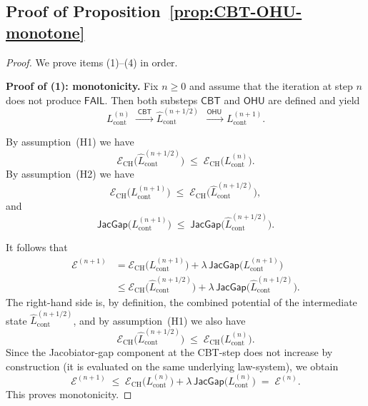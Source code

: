 \documentclass[11pt]{book}
\theoremstyle{plain}
\theoremstyle{definition}
\begin{document}
\subsection*{Proof of Proposition~\ref{prop:CBT-OHU-monotone}}


\begin{proof}
We prove items \textnormal{(1)}–\textnormal{(4)} in order.

\medskip\noindent
\textbf{Proof of (1): monotonicity.}
Fix \(n\ge 0\) and assume that the iteration at step \(n\) does not
produce \(\mathsf{FAIL}\).  Then both substeps \(\mathsf{CBT}\) and
\(\mathsf{OHU}\) are defined and yield
\[
  L_{\mathrm{cont}}^{(n)}
  \;\xrightarrow{\;\mathsf{CBT}\;}
  \widehat{L}_{\mathrm{cont}}^{(n+1/2)}
  \;\xrightarrow{\;\mathsf{OHU}\;}
  L_{\mathrm{cont}}^{(n+1)}.
\]

By assumption~(H1) we have
\[
  \mathcal{E}_{\mathrm{CH}}\bigl(
    \widehat{L}_{\mathrm{cont}}^{(n+1/2)}
  \bigr)
  \;\le\;
  \mathcal{E}_{\mathrm{CH}}\bigl(
    L_{\mathrm{cont}}^{(n)}
  \bigr).
\]
By assumption~(H2) we have
\[
  \mathcal{E}_{\mathrm{CH}}\bigl(
    L_{\mathrm{cont}}^{(n+1)}
  \bigr)
  \;\le\;
  \mathcal{E}_{\mathrm{CH}}\bigl(
    \widehat{L}_{\mathrm{cont}}^{(n+1/2)}
  \bigr),
\]
and
\[
  \mathsf{JacGap}\bigl(
    L_{\mathrm{cont}}^{(n+1)}
  \bigr)
  \;\le\;
  \mathsf{JacGap}\bigl(
    \widehat{L}_{\mathrm{cont}}^{(n+1/2)}
  \bigr).
\]

It follows that
\begin{align*}
  \mathcal{E}^{(n+1)}
  &= \mathcal{E}_{\mathrm{CH}}\bigl(
       L_{\mathrm{cont}}^{(n+1)}
     \bigr)
     +
     \lambda\,\mathsf{JacGap}\bigl(
       L_{\mathrm{cont}}^{(n+1)}
     \bigr) \\
  &\le
     \mathcal{E}_{\mathrm{CH}}\bigl(
       \widehat{L}_{\mathrm{cont}}^{(n+1/2)}
     \bigr)
     +
     \lambda\,\mathsf{JacGap}\bigl(
       \widehat{L}_{\mathrm{cont}}^{(n+1/2)}
     \bigr).
\end{align*}
The right-hand side is, by definition, the combined potential of the
intermediate state
\(\widehat{L}_{\mathrm{cont}}^{(n+1/2)}\), and by assumption~(H1) we
also have
\[
  \mathcal{E}_{\mathrm{CH}}\bigl(
    \widehat{L}_{\mathrm{cont}}^{(n+1/2)}
  \bigr)
  \;\le\;
  \mathcal{E}_{\mathrm{CH}}\bigl(
    L_{\mathrm{cont}}^{(n)}
  \bigr).
\]
Since the Jacobiator-gap component at the CBT-step does not increase
by construction (it is evaluated on the same underlying law-system),
we obtain
\[
  \mathcal{E}^{(n+1)}
  \;\le\;
  \mathcal{E}_{\mathrm{CH}}\bigl(
    L_{\mathrm{cont}}^{(n)}
  \bigr)
  +
  \lambda\,\mathsf{JacGap}\bigl(
    L_{\mathrm{cont}}^{(n)}
  \bigr)
  \;=\;
  \mathcal{E}^{(n)}.
\]
This proves monotonicity.




\end{proof}
\end{document}
